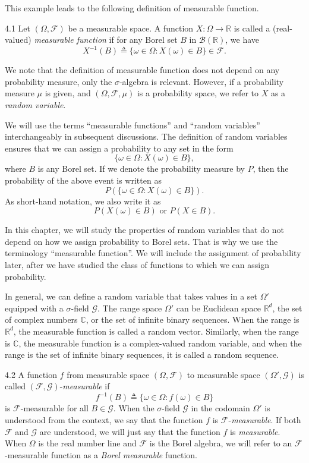 This example leads to the following definition of measurable function.

\begin{defbox}{4.1}
Let $(\Omega, \mathcal{F})$ be a measurable space. A function $X : \Omega \to \mathbb{R}$ is called a (real-valued) \textit{measurable function} if for any Borel set $B$ in $\mathcal{B}(\mathbb{R})$, we have
\[
X^{-1}(B) \triangleq \{\omega \in \Omega : X(\omega) \in B\} \in \mathcal{F}.
\]
\end{defbox}

We note that the definition of measurable function does not depend on any probability measure, only the $\sigma$-algebra is relevant. However, if a probability measure $\mu$ is given, and $(\Omega, \mathcal{F}, \mu)$ is a probability space, we refer to $X$ as a \textit{random variable}.

We will use the terms ``measurable functions'' and ``random variables'' interchangeably in subsequent discussions. The definition of random variables ensures that we can assign a probability to any set in the form
\[
\{\omega \in \Omega : X(\omega) \in B\},
\]
where $B$ is any Borel set. If we denote the probability measure by $P$, then the probability of the above event is written as
\[
P(\{\omega \in \Omega : X(\omega) \in B\}).
\]
As short-hand notation, we also write it as
\[
P(X(\omega) \in B) \text{ or } P(X \in B).
\]

In this chapter, we will study the properties of random variables that do not depend on how we assign probability to Borel sets. That is why we use the terminology ``measurable function''. We will include the assignment of probability later, after we have studied the class of functions to which we can assign probability.

In general, we can define a random variable that takes values in a set $\Omega'$ equipped with a $\sigma$-field $\mathcal{G}$. The range space $\Omega'$ can be Euclidean space $\mathbb{R}^d$, the set of complex numbers $\mathbb{C}$, or the set of infinite binary sequences. When the range is $\mathbb{R}^d$, the measurable function is called a random vector. Similarly, when the range is $\mathbb{C}$, the measurable function is a complex-valued random variable, and when the range is the set of infinite binary sequences, it is called a random sequence.

\begin{defbox}{4.2}
A function $f$ from measurable space $(\Omega, \mathcal{F})$ to measurable space $(\Omega', \mathcal{G})$ is called $(\mathcal{F}, \mathcal{G})$-\textit{measurable} if
\[
f^{-1}(B) \triangleq \{\omega \in \Omega : f(\omega) \in B\}
\]
is $\mathcal{F}$-measurable for all $B \in \mathcal{G}$. When the $\sigma$-field $\mathcal{G}$ in the codomain $\Omega'$ is understood from the context, we say that the function $f$ is $\mathcal{F}$-\textit{measurable}. If both $\mathcal{F}$ and $\mathcal{G}$ are understood, we will just say that the function $f$ is \textit{measurable}. When $\Omega$ is the real number line and $\mathcal{F}$ is the Borel algebra, we will refer to an $\mathcal{F}$-measurable function as a \textit{Borel measurable} function.
\end{defbox}

